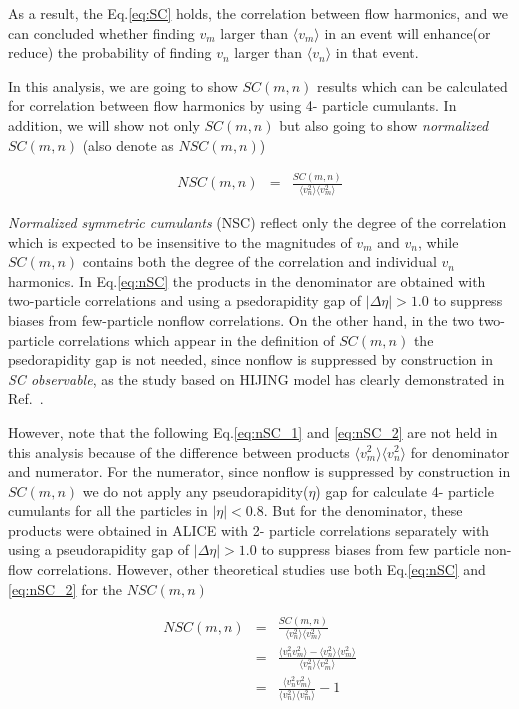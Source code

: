 As a result, the Eq.\ref{eq:SC} holds, the correlation between flow harmonics, and we can concluded whether finding $v_m$ larger than $\langle v_m \rangle$ in an event will enhance(or reduce) the probability of finding $v_n$ larger than $\langle v_n \rangle$ in that event. 

In this analysis, we are going to show $SC(m,n)$ results which can be calculated for correlation between flow harmonics by using 4- particle cumulants. In addition, we will show not only $SC(m,n)$ but also going to show  \textit{normalized} $SC(m,n)$ (also denote as $NSC(m,n)$)

\begin{eqnarray}
 NSC(m,n) &=& \frac{SC(m,n)}{\langle v_n^2 \rangle \langle v_m^2 \rangle } 	
 \label{eq:nSC}
\end{eqnarray}
\smallskip

\textit{Normalized symmetric cumulants} (NSC)  reflect only the degree of the correlation which is expected to be insensitive to the magnitudes of $v_{m}$ and $v_{n}$, while $SC(m,n)$ contains both the degree of the correlation and individual $v_{n}$ harmonics. In Eq.\ref{eq:nSC} the products in the denominator are obtained with two-particle correlations and using a psedorapidity gap of $|\Delta\eta|>1.0$ to suppress biases from few-particle nonflow correlations. On the other hand, in the two two-particle correlations which appear in the definition of $SC(m,n)$ the psedorapidity gap is not needed, since nonflow is suppressed by construction in \textit{SC observable}, as the study based on HIJING model has clearly demonstrated in Ref.~\cite{ALICE:2016kpq}.

However,  note that the following Eq.\ref{eq:nSC_1} and \ref{eq:nSC_2} are not held in this analysis because of the difference between products $\langle v_m^2 \rangle \langle v_n^2 \rangle$ for denominator and numerator. For the numerator, since nonflow is suppressed by construction in $SC(m,n)$ we do not apply any pseudorapidity($\eta$) gap for calculate 4- particle cumulants for all the particles in $|\eta| < 0.8$. But for the denominator, these products were obtained in ALICE with 2- particle correlations separately with using a pseudorapidity gap of $|\Delta \eta| >  1.0$ to suppress biases from few particle non-flow correlations. However, other theoretical studies \cite{Giacalone:2016afq} use both Eq.\ref{eq:nSC} and \ref{eq:nSC_2} for the  $NSC(m,n)$


\begin{eqnarray}
 NSC(m,n) &=& \frac{SC(m,n)}{\langle v_n^2 \rangle \langle v_m^2 \rangle } \nonumber \\ &=& \frac{ \langle  v_n^2 v_m^2 \rangle  - \langle v_n^2 \rangle \langle v_m^2 \rangle }{\langle v_n^2 \rangle \langle v_m^2 \rangle } \label{eq:nSC_1} \\ &=&   \frac{ \langle  v_n^2 v_m^2 \rangle   }{\langle v_n^2 \rangle \langle v_m^2 \rangle   }   -1	 \label{eq:nSC_2}
\end{eqnarray}


